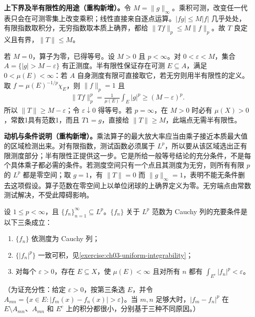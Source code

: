 \documentclass[../../main.tex]{subfiles}
\begin{document}
\begin{solution}
\textbf{上下界及半有限性的用途（重构新增）。}令 $M=\|g\|_\infty$。乘积可测，改变任一代表只会在可测零集上改变乘积；线性直接来自逐点运算。$|fg|\leqslant M|f|$ 几乎处处，有限指数取积分，无穷指数取本质上确界，都给 $\|Tf\|_p\leqslant M\|f\|_p$。故 $T$ 良定义且有界，$\|T\|\leqslant M$。

若 $M=0$，算子为零，已得等号。设 $M>0$ 且 $p<\infty$。对 $0<\varepsilon<M$，集合 $A=\{|g|>M-\varepsilon\}$ 有正测度。半有限性保证存在可测 $E\subseteq A$，满足 $0<\mu(E)<\infty$：若 $A$ 自身测度有限可直接取它，若无穷则用半有限性的定义。取 $f=\mu(E)^{-1/p}\chi_E$，则 $\|f\|_p=1$ 且
\begin{align*}
\|Tf\|_p^p=\frac1{\mu(E)}\int_E|g|^p\geqslant(M-\varepsilon)^p.
\end{align*}
所以 $\|T\|\geqslant M-\varepsilon$；令 $\varepsilon\downarrow0$ 得等号。若 $p=\infty$，在 $M>0$ 时必有 $\mu(X)>0$，常数1具有范数1，而且 $T1=g$，直接给 $\|T\|\geqslant M$，此端点无需半有限性。
\end{solution}
\begin{remark}
\textbf{动机与条件说明（重构新增）。}乘法算子的最大放大率应当由乘子接近本质最大值的区域检测出来。对有限指数，测试函数必须属于 $L^p$，所以要从该区域选出正有限测度部分；半有限性正提供这一步。它是所给一般等号结论的充分条件，不是每个具体乘子都必需的条件。若测度空间只有一个点且其测度为无穷，则所有有限 $p$ 的 $L^p$ 都是零空间；取 $g=1$，有 $\|T\|=0$ 而 $\|g\|_\infty=1$，表明不能无条件删去这项假设。算子范数在零空间上以单位闭球的上确界定义为零。无穷端点由常数测试解决，不受此障碍影响。
\end{remark}
\begin{exercise}\label{exercise:ch06-vitali-convergence}
设 $1\leqslant p<\infty$，且 $\{f_n\}_{n=1}^\infty\subseteq L^p$。$\{f_n\}$ 关于 $L^p$ 范数为 Cauchy 列的充要条件是以下三条成立：
\begin{enumerate}
\item\label{item:ch06-vitali-measure} $\{f_n\}$ 依测度为 Cauchy 列；
\item\label{item:ch06-vitali-integrability} $\{|f_n|^p\}$ 一致可积，见\cref{exercise:ch03-uniform-integrability}；
\item\label{item:ch06-vitali-tail} 对每个 $\varepsilon>0$，存在 $E\subseteq X$，使 $\mu(E)<\infty$ 且对所有 $n$ 都有 $\int_{E^c}|f_n|^p<\varepsilon$。
\end{enumerate}
（为证充分性：给定 $\varepsilon>0$，按第三条选 $E$，并令 $A_{mn}=\{x\in E:|f_m(x)-f_n(x)|>\varepsilon\}$。当 $m,n$ 足够大时，$|f_m-f_n|^p$ 在 $E\setminus A_{mn}$、$A_{mn}$ 和 $E^c$ 上的积分都很小，分别基于三种不同原因。）
\end{exercise}
\end{document}
